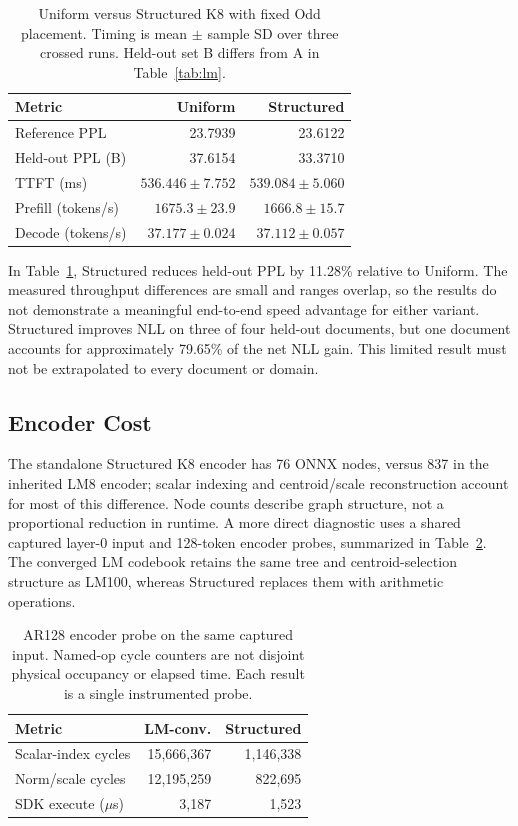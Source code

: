 \documentclass[conference,a4paper,10pt]{IEEEtran}
\begin{document}
\begin{table}[t]
\caption{Uniform versus Structured K8 with fixed Odd placement. Timing is mean $\pm$ sample SD over three crossed runs. Held-out set B differs from A in Table~\ref{tab:lm}.}
\label{tab:uniform}
\centering
\setlength{\tabcolsep}{4pt}
\begin{tabular}{@{}lrr@{}}
\toprule
Metric & Uniform & Structured\\
\midrule
Reference PPL & 23.7939 & 23.6122\\
Held-out PPL (B) & 37.6154 & 33.3710\\
TTFT (ms) & $536.446\pm7.752$ & $539.084\pm5.060$\\
Prefill (tokens/s) & $1675.3\pm23.9$ & $1666.8\pm15.7$\\
Decode (tokens/s) & $37.177\pm0.024$ & $37.112\pm0.057$\\
\bottomrule
\end{tabular}
\end{table}

In Table~\ref{tab:uniform}, Structured reduces held-out PPL by 11.28\% relative to Uniform. The measured throughput differences are small and ranges overlap, so the results do not demonstrate a meaningful end-to-end speed advantage for either variant. Structured improves NLL on three of four held-out documents, but one document accounts for approximately 79.65\% of the net NLL gain. This limited result must not be extrapolated to every document or domain.

\subsection{Encoder Cost}
The standalone Structured K8 encoder has 76 ONNX nodes, versus 837 in the inherited LM8 encoder; scalar indexing and centroid/scale reconstruction account for most of this difference. Node counts describe graph structure, not a proportional reduction in runtime. A more direct diagnostic uses a shared captured layer-0 input and 128-token encoder probes, summarized in Table~\ref{tab:encoder}. The converged LM codebook retains the same tree and centroid-selection structure as LM100, whereas Structured replaces them with arithmetic operations.

\begin{table}[t]
\caption{AR128 encoder probe on the same captured input. Named-op cycle counters are not disjoint physical occupancy or elapsed time. Each result is a single instrumented probe.}
\label{tab:encoder}
\centering
\setlength{\tabcolsep}{4pt}
\begin{tabular}{@{}lrr@{}}
\toprule
Metric & LM-conv. & Structured\\
\midrule
Scalar-index cycles & 15,666,367 & 1,146,338\\
Norm/scale cycles & 12,195,259 & 822,695\\
SDK execute ($\mu$s) & 3,187 & 1,523\\
\bottomrule
\end{tabular}
\end{table}
\end{document}
